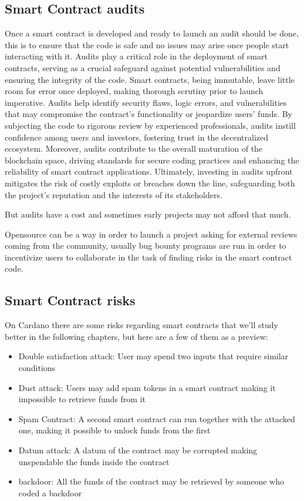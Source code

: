 \subsection{Smart Contract audits}

Once a smart contract is developed and ready to launch an audit should be done, this is to ensure that the code is safe and no issues may arise once people start interacting with it.
Audits play a critical role in the deployment of smart contracts, serving as a crucial safeguard against potential vulnerabilities and ensuring the integrity of the code. 
Smart contracts, being immutable, leave little room for error once deployed, making thorough scrutiny prior to launch imperative. 
Audits help identify security flaws, logic errors, and vulnerabilities that may compromise the contract's functionality or jeopardize users' funds. 
By subjecting the code to rigorous review by experienced professionals, audits instill confidence among users and investors, fostering trust in the decentralized ecosystem. Moreover, audits contribute to the overall maturation of the blockchain space, driving standards for secure coding practices and enhancing the reliability of smart contract applications. 
Ultimately, investing in audits upfront mitigates the risk of costly exploits or breaches down the line, safeguarding both the project's reputation and the interests of its stakeholders.

But audits have a cost and sometimes early projects may not afford that much.

Opensource can be a way in order to launch a project asking for external reviews coming from the community, usually bug bounty programs are run in order to incentivize users to collaborate in the task of finding risks in the smart contract code.

\subsection{Smart Contract risks}

On Cardano there are some risks regarding smart contracts that we'll study better in the following chapters, but here are a few of them as a preview:

\begin{itemize}
    \item Double satisfaction attack: User may spend two inputs that require similar conditions
    \item Dust attack: Users may add spam tokens in a smart contract making it impossible to retrieve funds from it
    \item Spam Contract: A second smart contract can run together with the attacked one, making it possible to unlock funds from the first 
    \item Datum attack: A datum of the contract may be corrupted making unspendable the funds inside the contract
    \item backdoor: All the funds of the contract may be retrieved by someone who coded a backdoor
\end{itemize}

